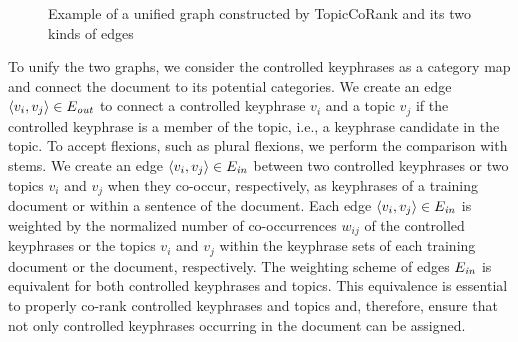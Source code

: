 \begin{figure*}
      \caption{Example of a unified graph constructed by TopicCoRank and its two
               kinds of edges
               \label{fig:topicrankpp_graph}}
    \end{figure*}

    To unify the two graphs, we consider the controlled keyphrases as a category map and connect the document to its potential categories. We create an edge
    $\langle{}v_i, v_j\rangle{} \in E_{\textnormal{\textit{out}}}$ to connect a controlled
    keyphrase $v_i$ and a topic $v_j$ if the controlled keyphrase is a
    member of the topic, i.e., a keyphrase candidate in the topic.
    To accept flexions, such as plural flexions, we perform the comparison with
    stems.
    We create an edge $\langle{}v_i, v_j\rangle{} \in E_\textnormal{\textit{in}}$ between two controlled
    keyphrases or two topics $v_i$ and $v_j$ when they co-occur, respectively, as keyphrases of
    a training document or within a sentence of the
    document. Each edge $\langle{}v_i, v_j\rangle{} \in E_{\textnormal{\textit{in}}}$ is weighted by
    the normalized number of co-occurrences $w_{ij}$ of the controlled
    keyphrases or the topics $v_i$ and $v_j$ within the keyphrase sets of each training document or the document, respectively. The weighting scheme of edges
    $E_\textnormal{\textit{in}}$ is equivalent for both controlled keyphrases and
    topics. This equivalence is essential to properly co-rank controlled keyphrases
    and topics and, therefore, ensure that not only controlled keyphrases occurring in the document can be assigned.

